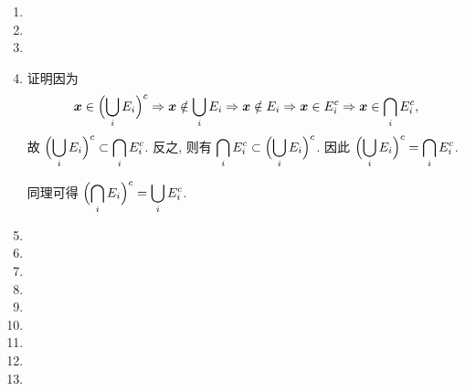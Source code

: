 \documentclass[a4paper, 11pt]{ctexart}
\begin{document}
\begin{enumerate}
    \item %
    \item %
    \item %
    \item %
        {\heiti 证明}\quad 因为
        \[
            \boldsymbol{x} \in \Bigl(\bigcup_i E_i\Bigr)^c \Rightarrow \boldsymbol{x} \notin \bigcup_i E_i
            \Rightarrow \boldsymbol{x} \notin E_i \Rightarrow \boldsymbol{x} \in E_i^c
            \Rightarrow \boldsymbol{x} \in \bigcap_i E_i^c,    
        \]
        故 $\displaystyle{\Bigl(\bigcup_i E_i\Bigr)^c \subset \bigcap_i E_i^c}$. 反之, 则有 $\displaystyle{\bigcap_i E_i^c \subset \Bigl(\bigcup_i E_i\Bigr)^c}$.
        因此 $\displaystyle{\Bigl(\bigcup_i E_i\Bigr)^c = \bigcap_i E_i^c}$.
        
        同理可得 $\displaystyle{\Bigl(\bigcap_i E_i\Bigr)^c = \bigcup_i E_i^c}$.
    \item %
    \item %
    \item %
    \item %
    \item %
    \item %
    \item %
    \item %
    \item %
\end{enumerate}
\end{document}
